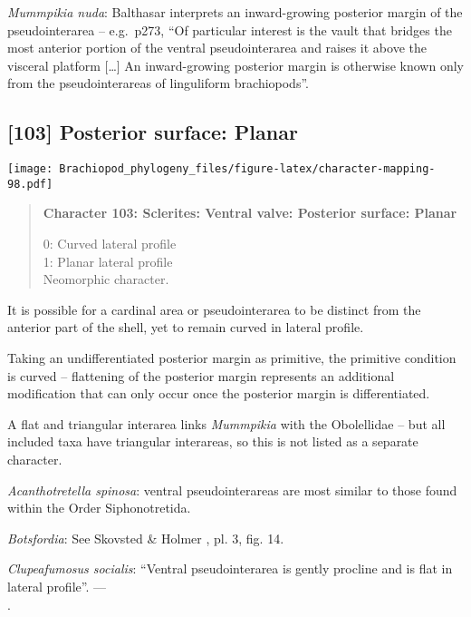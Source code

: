 \documentclass[openany]{book}
\theoremstyle{definition}
\theoremstyle{definition}
\theoremstyle{definition}
\theoremstyle{remark}
\begin{document}
\hypertarget{Mummpikia_nuda-coding-102}{}
\emph{Mummpikia nuda}: Balthasar \citeyearpar{Balthasar2008iMummpikia}
interprets an inward-growing posterior margin of the pseudointerarea --
e.g.~p273, ``Of particular interest is the vault that bridges the most
anterior portion of the ventral pseudointerarea and raises it above the
visceral platform {[}\ldots{}{]} An inward-growing posterior margin is
otherwise known only from the pseudointerareas of linguliform
brachiopods''.

\subsection*{{[}103{]} Posterior surface:
Planar}\label{posterior-surface-planar}

\texttt{[image: Brachiopod\_phylogeny\_files/figure-latex/character-mapping-98.pdf]}

\begin{quote}
\textbf{Character 103: Sclerites: Ventral valve: Posterior surface:
Planar}

0: Curved lateral profile\\
1: Planar lateral profile\\
Neomorphic character.
\end{quote}

It is possible for a cardinal area or pseudointerarea to be distinct
from the anterior part of the shell, yet to remain curved in lateral
profile.

Taking an undifferentiated posterior margin as primitive, the primitive
condition is curved -- flattening of the posterior margin represents an
additional modification that can only occur once the posterior margin is
differentiated.

A flat and triangular interarea links \emph{Mummpikia} with the
Obolellidae \citep{Balthasar2008iMummpikia} -- but all included taxa
have triangular interareas, so this is not listed as a separate
character.

\hypertarget{Acanthotretella_spinosa-coding-103}{}
\emph{Acanthotretella spinosa}: ventral pseudointerareas are most
similar to those found within the Order Siphonotretida.

\hypertarget{Botsfordia-coding-103}{}
\emph{Botsfordia}: See Skovsted \& Holmer
\citeyearpar{Skovsted2005EarlyCambrian}, pl. 3, fig. 14.

\hypertarget{Clupeafumosus_socialis-coding-103}{}
\emph{Clupeafumosus socialis}: ``Ventral pseudointerarea is gently
procline and is flat in lateral profile''. ---\\
\citep{Topper2013Reappraisalof}.
\end{document}

